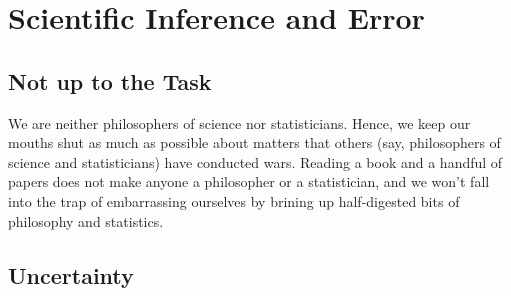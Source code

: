\chapter{Scientific Inference and Error}
\label{sec:scientificinferenceanderror}

\section{Not up to the Task}
\label{sec:notuptothetask}

We are neither philosophers of science nor statisticians.
Hence, we keep our mouths shut as much as possible about matters that others (say, philosophers of science and statisticians) have conducted wars.
Reading a book and a handful of papers does not make anyone a philosopher or a statistician, and we won't fall into the trap of embarrassing ourselves by brining up half-digested bits of philosophy and statistics.


\section{Uncertainty}
\label{sec:uncertainty}

